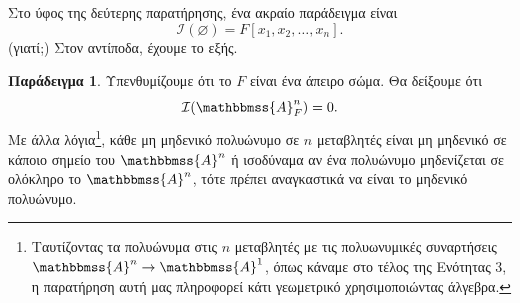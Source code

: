 \documentclass[12pt,a4paper,reqno]{amsart}
\theoremstyle{definition}
\newtheorem{example}[theorem]{Παράδειγμα}
\theoremstyle{remark}
\numberwithin{theorem}{section}
\numberwithin{exercise}{section}
\numberwithin{equation}{section}
\renewcommand{\AA}{\mathbbmss{A}}
\newcommand{\iI}{\mathcal{I}}
\renewcommand{\to}{\rightarrow}
\renewcommand{\emptyset}{\varnothing}
\newcommand{\Pol}[1]{F[x_1, x_2, \dots, x_{#1}]}
\begin{document}
Στο ύφος της δεύτερης παρατήρησης, ένα ακραίο παράδειγμα είναι 
\[
\iI(\emptyset) = \Pol{n}.
\]
(γιατί;) Στον αντίποδα, έχουμε το εξής.
\begin{example}
    \label{ex:vanishing_ideal_of_emptyset}
    Υπενθυμίζουμε ότι το $F$ είναι ένα άπειρο σώμα. Θα δείξουμε ότι 
    \[
    \iI(\AA_F^n) = 0.
    \]
    Με άλλα λόγια\footnote{Ταυτίζοντας τα πολυώνυμα στις $n$ μεταβλητές με τις πολυωνυμικές συναρτήσεις $\AA^n \to \AA^1$, όπως κάναμε στο τέλος της Ενότητας 3, η παρατήρηση αυτή μας πληροφορεί κάτι γεωμετρικό χρησιμοποιώντας άλγεβρα.}, κάθε μη μηδενικό πολυώνυμο σε $n$ μεταβλητές είναι μη μηδενικό σε κάποιο σημείο του $\AA^n$ ή ισοδύναμα αν ένα πολυώνυμο μηδενίζεται σε ολόκληρο το $\AA^n$, τότε πρέπει αναγκαστικά να είναι το μηδενικό πολυώνυμο.
\end{example}


\end{document}

